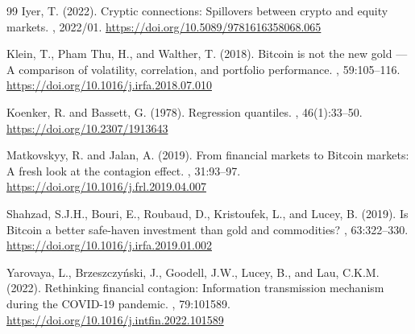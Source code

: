 \documentclass[11pt,a4paper]{article}
\begin{document}
\begin{thebibliography}{99}
Iyer, T. (2022).
\newblock Cryptic connections: Spillovers between crypto and equity markets.
, 2022/01.
\newblock \url{https://doi.org/10.5089/9781616358068.065}

Klein, T., Pham Thu, H., and Walther, T. (2018).
\newblock Bitcoin is not the new gold --- A comparison of volatility, correlation, and portfolio performance.
, 59:105--116.
\newblock \url{https://doi.org/10.1016/j.irfa.2018.07.010}

Koenker, R. and Bassett, G. (1978).
\newblock Regression quantiles.
, 46(1):33--50.
\newblock \url{https://doi.org/10.2307/1913643}

Matkovskyy, R. and Jalan, A. (2019).
\newblock From financial markets to Bitcoin markets: A fresh look at the contagion effect.
, 31:93--97.
\newblock \url{https://doi.org/10.1016/j.frl.2019.04.007}

Shahzad, S.J.H., Bouri, E., Roubaud, D., Kristoufek, L., and Lucey, B. (2019).
\newblock Is Bitcoin a better safe-haven investment than gold and commodities?
, 63:322--330.
\newblock \url{https://doi.org/10.1016/j.irfa.2019.01.002}

Yarovaya, L., Brzeszczy\'nski, J., Goodell, J.W., Lucey, B., and Lau, C.K.M. (2022).
\newblock Rethinking financial contagion: Information transmission mechanism during the COVID-19 pandemic.
, 79:101589.
\newblock \url{https://doi.org/10.1016/j.intfin.2022.101589}

\end{thebibliography}
\end{document}
